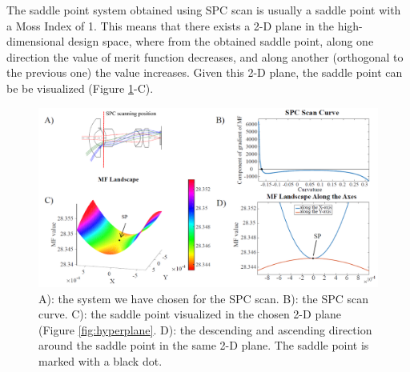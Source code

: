 The saddle point system obtained using SPC scan is usually a saddle point with a Moss Index of 1. This means that there exists a 2-D plane in the high-dimensional design space, where from the obtained saddle point, along one direction the value of merit function decreases, and along another (orthogonal to the previous one) the value increases. Given this 2-D plane, the saddle point can be be visualized (Figure \ref{fig:WAL_demo_sp}-C). 
\begin{figure}[h!]
    \centering
    \includegraphics[width=\textwidth]{chapter-4/figures/WAL_demo_sp_2.png}
    \caption{A): the system we have chosen for the SPC scan. B): the SPC scan curve. C): the saddle point visualized in the chosen 2-D plane (Figure \ref{fig:hyperplane}. D): the descending and ascending direction around the saddle point in the same 2-D plane. The saddle point is marked with a black dot.}
    \label{fig:WAL_demo_sp}
\end{figure}

